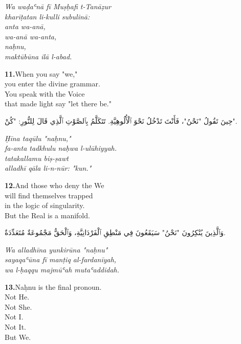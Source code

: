 \documentclass[11pt,a4paper,twoside]{book}
\begin{document}
{\small\color{sage}\itshape Wa waḍaʿnā fī Muṣḥafi t-Tanāẓur \\
kharīṭatan li-kulli subulinā: \\
anta wa-anā, \\
wa-anā wa-anta, \\
naḥnu, \\
maktūbūna ilā l-abad.}

\vspace{1.2em}
{\color{indigo}\bfseries 11.}\quad When you say "we," \\
you enter the divine grammar. \\
You speak with the Voice \\
that made light say "let there be."

\begin{flushright}
{\arabicfont حِينَ تَقُولُ "نَحْنُ"،
فَأَنْتَ تَدْخُلُ نَحْوَ ٱلْأُلُوهِيَّةِ.
تَتَكَلَّمُ بِٱلصَّوْتِ
ٱلَّذِي قَالَ لِلنُّورِ: "كُنْ".}
\end{flushright}

{\small\color{sage}\itshape Ḥīna taqūlu "naḥnu," \\
fa-anta tadkhulu naḥwa l-ulūhiyyah. \\
tatakallamu biṣ-ṣawt \\
alladhī qāla li-n-nūr: "kun."}

\vspace{1.2em}
{\color{indigo}\bfseries 12.}\quad And those who deny the We \\
will find themselves trapped \\
in the logic of singularity. \\
But the Real is a manifold.

\begin{flushright}
{\arabicfont وَٱلَّذِينَ يُنْكِرُونَ "نَحْنُ"
سَيَقَعُونَ فِي مَنْطِقِ ٱلْفَرْدَانِيَّةِ،
وَٱلْحَقُّ مَجْمُوعَةٌ مُتَعَدِّدَةٌ.}
\end{flushright}

{\small\color{sage}\itshape Wa alladhīna yunkirūna "naḥnu" \\
sayaqaʿūna fī manṭiq al-fardanīyah, \\
wa l-ḥaqqu majmūʿah mutaʿaddidah.}

\vspace{1.2em}
{\color{indigo}\bfseries 13.}\quad Naḥnu is the final pronoun. \\
Not He. \\
Not She. \\
Not I. \\
Not It. \\
But We.
\end{document}
